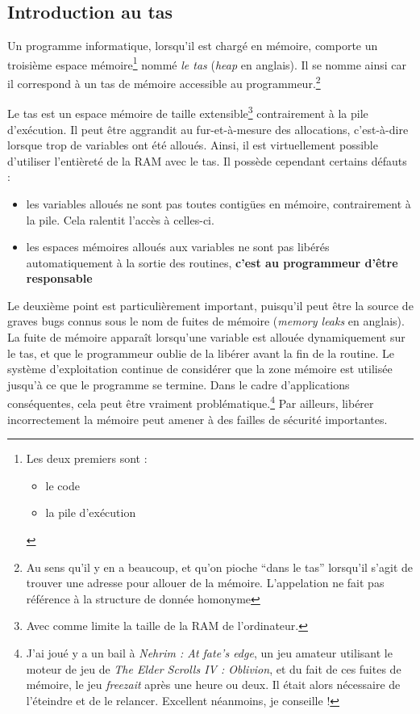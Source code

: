 \documentclass[../../../main.tex]{subfiles}
\begin{document}
\subsection{Introduction au tas}
\label{sub:introduction_au_tas}
Un programme informatique, lorsqu'il est chargé en mémoire, comporte un troisième espace mémoire\footnote{Les deux premiers sont :\begin{itemize}
	\item le code
	\item la pile d'exécution
\end{itemize}} nommé \textit{le tas} (\textit{heap} en anglais). Il se nomme ainsi car il correspond à un tas de mémoire accessible au programmeur.\footnote{Au sens qu'il y en a beaucoup, et qu'on pioche ``dans le tas'' lorsqu'il s'agit de trouver une adresse pour allouer de la mémoire. L'appelation ne fait pas référence à la structure de donnée homonyme}
 
Le tas est un espace mémoire de taille extensible\footnote{Avec comme limite la taille de la RAM de l'ordinateur.} contrairement à la pile d'exécution. Il peut être aggrandit au fur-et-à-mesure des allocations, c'est-à-dire lorsque trop de variables ont été alloués. Ainsi, il est virtuellement possible d'utiliser l'entièreté de la RAM avec le tas. Il possède cependant certains défauts :
\begin{itemize}
	\item les variables alloués ne sont pas toutes contigües en mémoire, contrairement à la pile. Cela ralentit l'accès à celles-ci.
	\item les espaces mémoires alloués aux variables ne sont pas libérés automatiquement à la sortie des routines, \textbf{c'est au programmeur d'être responsable}
\end{itemize}
Le deuxième point est particulièrement important, puisqu'il peut être la source de graves bugs connus sous le nom de fuites de mémoire (\textit{memory leaks} en anglais). La fuite de mémoire apparaît lorsqu'une variable est allouée dynamiquement sur le tas, et que le programmeur oublie de la libérer avant la fin de la routine. Le système d'exploitation continue de considérer que la zone mémoire est utilisée jusqu'à ce que le programme se termine. Dans le cadre d'applications conséquentes, cela peut être vraiment problématique.\footnote{J'ai joué y a un bail à \textit{Nehrim : At fate's edge}, un jeu amateur utilisant le moteur de jeu de \textit{The Elder Scrolls IV : Oblivion}, et du fait de ces fuites de mémoire, le jeu \textit{freezait} après une heure ou deux. Il était alors nécessaire de l'éteindre et de le relancer. Excellent néanmoins, je conseille !} Par ailleurs, libérer incorrectement la mémoire peut amener à des failles de sécurité importantes.
 
\end{document}
